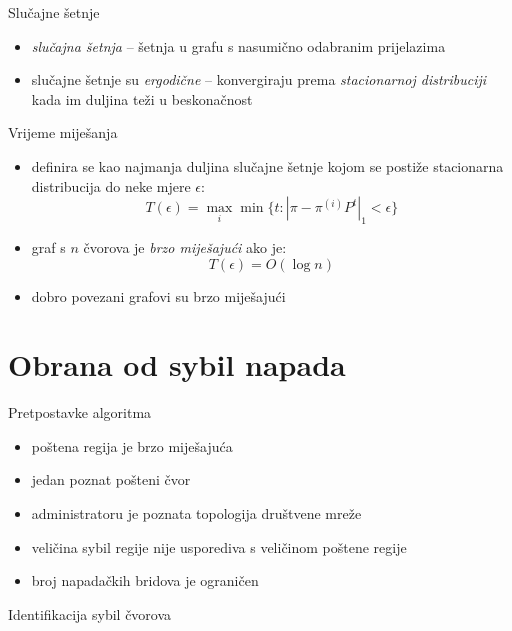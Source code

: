 \documentclass{beamer}
\begin{document}
\begin{frame}{Slučajne šetnje}
  \begin{itemize}
    \item \textit{slučajna šetnja} -- šetnja u grafu s nasumično odabranim prijelazima
    \item slučajne šetnje su \textit{ergodične} -- konvergiraju prema \textit{stacionarnoj distribuciji} kada im duljina teži u beskonačnost
  \end{itemize}
\end{frame}

\begin{frame}{Vrijeme miješanja}
  \begin{itemize}
    \item definira se kao najmanja duljina slučajne šetnje kojom se postiže stacionarna distribucija do neke mjere $\epsilon$:
      \[ T(\epsilon) = \max_{i} \min \{t : |\pi - \pi^{(i)} P^t|_1 < \epsilon\} \]
    \item graf s $n$ čvorova je \textit{brzo miješajući} ako je:
      \[ T(\epsilon) = O(\log n) \]
    \item dobro povezani grafovi su brzo miješajući
  \end{itemize}
\end{frame}

\section{Obrana od sybil napada}

\begin{frame}{Pretpostavke algoritma}
  \begin{itemize}
    \item poštena regija je brzo miješajuća
    \item jedan poznat pošteni čvor
    \item administratoru je poznata topologija društvene mreže
    \item veličina sybil regije nije usporediva s veličinom poštene regije
    \item broj napadačkih bridova je ograničen
  \end{itemize}
\end{frame}

\begin{frame}{Identifikacija sybil čvorova}
  \begin{itemize}
  \end{itemize}
\end{frame}
\end{document}
